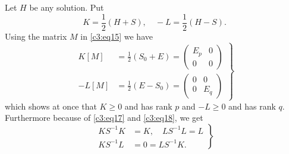 Let $H$ be any solution. Put
\begin{equation*}
K=\frac{1}{2}(H+S),\quad -L=\frac{1}{2}(H-S).\tag{18}\label{c3:eq18}
\end{equation*}
Using the matrix $M$ in \eqref{c3:eq15} we have
\begin{equation*}
\left.
\begin{aligned}
K[M] &= \frac{1}{2}(S_{0}+E)=
\begin{pmatrix}
E_{p} & 0\\
0 & 0
\end{pmatrix}\\
-L[M] &= \frac{1}{2}(E-S_{0})=
\begin{pmatrix}
0 & 0\\
0 & E_{q}
\end{pmatrix}
\end{aligned}
\right\}
\tag{19}\label{c3:eq19}
\end{equation*}
which shows at once that $K\geq 0$ and has rank $p$ and $-L\geq 0$ and
has rank $q$. Furthermore because of \eqref{c3:eq17} and \eqref{c3:eq18}, we get
\begin{equation*}
\left.
\begin{aligned}
KS^{-1} K &=K,\quad LS^{-1}L=L\\
KS^{-1} L &= 0=LS^{-1}K.
\end{aligned}
\right\}\tag{20}\label{c3:eq20}
\end{equation*}

